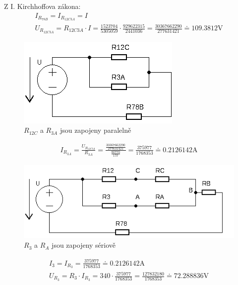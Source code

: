 \documentclass[12pt,a4paper]{article}
\begin{document}
\large{Z I. Kirchhoffova zákona:}
\begin{gather*}
	I_{R_{78B}} = I_{R_{12C3A}} = I \\[0.2cm]
	U_{R_{12C3A}} = R_{12C3A} \cdot I = \frac{1523704}{5305059}\cdot\frac{929622315}{2441036} = \frac{30367662290}{277631421} \doteq 109.3812\text{V}
\end{gather*}
\begin{figure}[H]
		\center\includegraphics[width=0.6\linewidth]{img2.png}
		\caption*{$R_{12C}$ a $R_{3A}$ jsou zapojeny paralelně}
\end{figure}
\begin{gather*}
	I_{R_{3A}} = \frac{U_{R_{12C3A}}}{R_{3A}} = \frac{\frac{30367662290}{277631421}}{\frac{80770}{157}} = \frac{375977}{1768353} \doteq 0.2126142\text{A}
\end{gather*}
\begin{figure}[H]
		\center\includegraphics[width=1.1\linewidth]{img1.png}
		\caption*{$R_3$ a $R_A$ jsou zapojeny sériově}
\end{figure}
\begin{gather*}
	I_3 = I_{R_3} = \frac{375977}{1768353} \doteq 0.2126142\text{A}\\[0.2cm]
	U_{R_3} = R_3 \cdot I_{R_3} = 340 \cdot \frac{375977}{1768353} = \frac{127832180}{1768353} \doteq 72.288836\text{V}
\end{gather*}
\pagebreak
\end{document}
